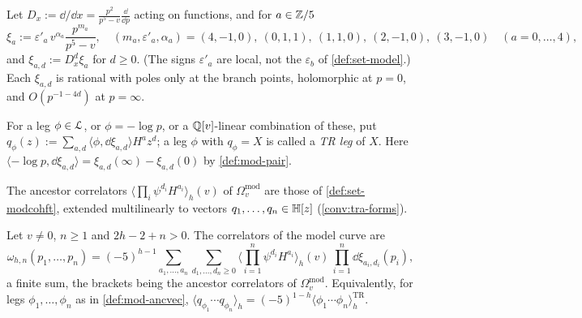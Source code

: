 \begin{defn}
\label{def:mod-xi}
Let $D_x:=\dd/\dd x=\frac{p^2}{p^5-v}\frac{\dd}{\dd p}$ acting on functions, and for $a\in\mathbb{Z}/5$
\[
\xi_a:=\varepsilon'_a\,v^{\alpha_a}\frac{p^{m_a}}{p^5-v},\quad (m_a,\varepsilon'_a,\alpha_a)=(4,-1,0),\ (0,1,1),\ (1,1,0),\ (2,-1,0),\ (3,-1,0)\quad(a=0,\dots,4),
\]
and $\xi_{a,d}:=D_x^d\xi_a$ for $d\geq 0$. (The signs $\varepsilon'_a$ are local, not the $\varepsilon_b$ of \cref{def:set-model}.) Each $\xi_{a,d}$ is rational with poles only at the branch points, holomorphic at $p=0$, and $O(p^{-1-4d})$ at $p=\infty$.
\end{defn}

\begin{defn}
\label{def:mod-ancvec}
For a leg $\phi\in\mathcal{L}$, or $\phi=-\log p$, or a $\mathbb{Q}[v]$-linear combination of these, put $q_\phi(z):=\sum_{a,d}\langle\phi,\dd\xi_{a,d}\rangle H^az^d$; a leg $\phi$ with $q_\phi=X$ is called a \emph{TR leg} of $X$. Here $\langle-\log p,\dd\xi_{a,d}\rangle=\xi_{a,d}(\infty)-\xi_{a,d}(0)$ by \cref{def:mod-pair}.
\end{defn}

The ancestor correlators $\langle\prod_i\psi^{d_i}H^{a_i}\rangle_h(v)$ of $\Omega^{\mathrm{mod}}_v$ are those of \cref{def:set-modcohft}, extended multilinearly to vectors $q_1,\dots,q_n\in\mathbb{H}[z]$ (\cref{conv:tra-forms}).

\begin{thm}
\label{thm:mod-tr}
Let $v\neq 0$, $n\geq1$ and $2h-2+n>0$. The correlators of the model curve are
\begin{equation}
\label{eq:mod-tr}
\omega_{h,n}(p_1,\dots,p_n)=(-5)^{h-1}\sum_{a_1,\dots,a_n}\sum_{d_1,\dots,d_n\geq 0}\Big\langle\prod_{i=1}^n\psi^{d_i}H^{a_i}\Big\rangle_h(v)\,\prod_{i=1}^n\dd\xi_{a_i,d_i}(p_i),
\end{equation}
a finite sum, the brackets being the ancestor correlators of $\Omega^{\mathrm{mod}}_v$. Equivalently, for legs $\phi_1,\dots,\phi_n$ as in \cref{def:mod-ancvec}, $\langle q_{\phi_1}\cdots q_{\phi_n}\rangle_h=(-5)^{1-h}\langle\phi_1\cdots\phi_n\rangle^{\mathrm{TR}}_h$.
\end{thm}


